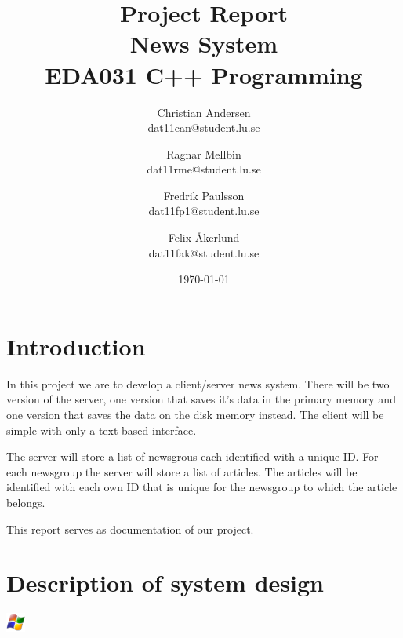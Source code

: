 \documentclass[a4paper]{article}
\title{Project Report \\ News System  \\ EDA031 C++ Programming}
\date{\today}
\author{Christian Andersen \\ dat11can@student.lu.se \and Ragnar Mellbin \\ dat11rme@student.lu.se \and Fredrik Paulsson \\ dat11fp1@student.lu.se
\and Felix \AA kerlund \\ dat11fak@student.lu.se}
\begin{document}
\clearpage\maketitle
\thispagestyle{empty}
\newpage


\section{Introduction}
In this project we are to develop a client/server news system. There will be two version of the server, one version that saves it's data in the primary memory and one version that saves the data on the disk memory instead. The client will be simple with only a text based interface.

The server will store a list of newsgrous each identified with a unique ID. For each newsgroup the server will store a list of articles. The articles will be identified with each own ID that is unique for the newsgroup to which the article belongs.

This report serves as documentation of our project.

\section{Description of system design}
\includegraphics[width=\textwidth]{uml_seq}
\end{document}
